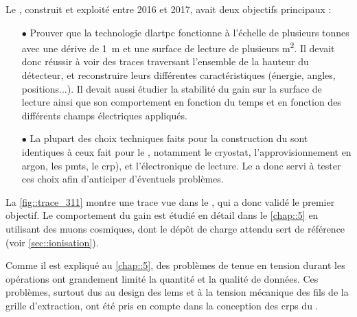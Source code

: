       Le \TOO{}, construit et exploité entre 2016 et 2017, avait deux objectifs principaux :
      \begin{itemize}
        \item[$\bullet$] Prouver que la technologie \gls{dlartpc} fonctionne à l'échelle de plusieurs tonnes avec une dérive de \SI{1}{\meter} et une surface de lecture de plusieurs \si{\meter\squared}. Il devait donc réussir à voir des traces traversant l'ensemble de la hauteur du détecteur, et reconstruire leurs différentes caractéristiques (énergie, angles, positions...). Il devait aussi étudier la stabilité du gain sur la surface de lecture ainsi que son comportement en fonction du temps et en fonction des différents champs électriques appliqués.
        \item[$\bullet$] La plupart des choix techniques faits pour la construction du \TOO{} sont identiques à ceux fait pour le \SSS{}, notamment le cryostat, l'approvisionnement en argon, les \glspl{pmt}, le \gls{crp}), et l'électronique de lecture. Le \TOO{} a donc servi à tester ces choix afin d'anticiper d'éventuels problèmes.
      \end{itemize}
      La \autoref{fig::trace_311} montre une trace vue dans le \TOO{}, qui a donc validé le premier objectif. Le comportement du gain est étudié en détail dans le \autoref{chap::5} en utilisant des muons cosmiques, dont le dépôt de charge attendu sert de référence (voir \autoref{sec::ionisation}).

      Comme il est expliqué au \autoref{chap::5}, des problèmes de tenue en tension durant les opérations ont grandement limité la quantité et la qualité de données. Ces problèmes, surtout dus au design des \glspl{lem} et à la tension mécanique des fils de la grille d'extraction, ont été pris en compte dans la conception des \glspl{crp} du \SSS{}.

